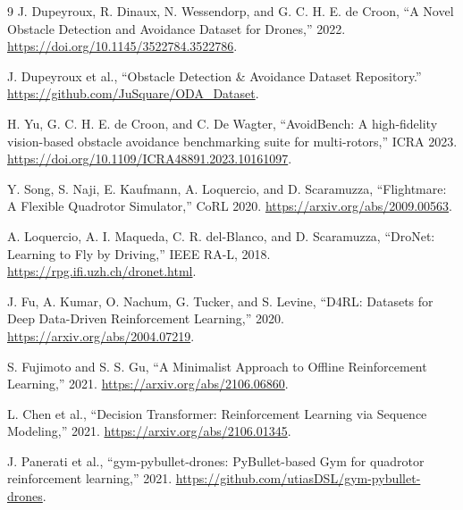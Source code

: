 \documentclass[10pt,letterpaper,twocolumn]{article}
\begin{document}
\renewcommand{\refname}{TÀI LIỆU THAM KHẢO}
\balance
{\small
\begin{thebibliography}{9}
\setlength{\itemsep}{0pt}
\setlength{\parskip}{0pt}
J. Dupeyroux, R. Dinaux, N. Wessendorp, and G. C. H. E. de Croon, ``A Novel Obstacle Detection and Avoidance Dataset for Drones,'' 2022. \url{https://doi.org/10.1145/3522784.3522786}.

J. Dupeyroux et al., ``Obstacle Detection \& Avoidance Dataset Repository.'' \url{https://github.com/JuSquare/ODA_Dataset}.

H. Yu, G. C. H. E. de Croon, and C. De Wagter, ``AvoidBench: A high-fidelity vision-based obstacle avoidance benchmarking suite for multi-rotors,'' ICRA 2023. \url{https://doi.org/10.1109/ICRA48891.2023.10161097}.

Y. Song, S. Naji, E. Kaufmann, A. Loquercio, and D. Scaramuzza, ``Flightmare: A Flexible Quadrotor Simulator,'' CoRL 2020. \url{https://arxiv.org/abs/2009.00563}.

A. Loquercio, A. I. Maqueda, C. R. del-Blanco, and D. Scaramuzza, ``DroNet: Learning to Fly by Driving,'' IEEE RA-L, 2018. \url{https://rpg.ifi.uzh.ch/dronet.html}.

J. Fu, A. Kumar, O. Nachum, G. Tucker, and S. Levine, ``D4RL: Datasets for Deep Data-Driven Reinforcement Learning,'' 2020. \url{https://arxiv.org/abs/2004.07219}.

S. Fujimoto and S. S. Gu, ``A Minimalist Approach to Offline Reinforcement Learning,'' 2021. \url{https://arxiv.org/abs/2106.06860}.

L. Chen et al., ``Decision Transformer: Reinforcement Learning via Sequence Modeling,'' 2021. \url{https://arxiv.org/abs/2106.01345}.

J. Panerati et al., ``gym-pybullet-drones: PyBullet-based Gym for quadrotor reinforcement learning,'' 2021. \url{https://github.com/utiasDSL/gym-pybullet-drones}.
\end{thebibliography}
}
\end{document}
